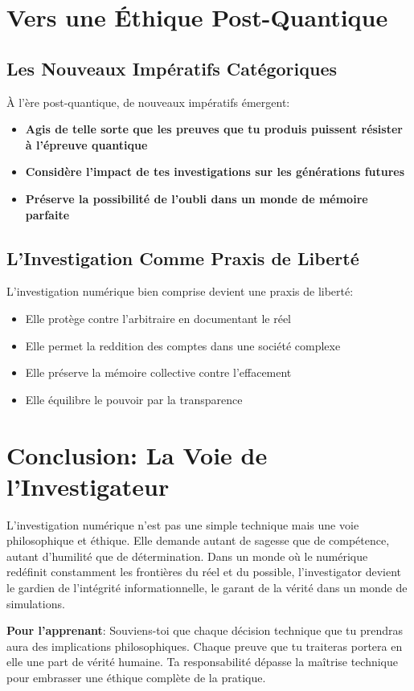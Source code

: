\section{Vers une Éthique Post-Quantique}
\subsection{Les Nouveaux Impératifs Catégoriques}
À l'ère post-quantique, de nouveaux impératifs émergent:
\begin{itemize}
\item \textbf{Agis de telle sorte que les preuves que tu produis puissent résister à l'épreuve quantique}
\item \textbf{Considère l'impact de tes investigations sur les générations futures}
\item \textbf{Préserve la possibilité de l'oubli dans un monde de mémoire parfaite}
\end{itemize}

\subsection{L'Investigation Comme Praxis de Liberté}
L'investigation numérique bien comprise devient une praxis de liberté:
\begin{itemize}
\item Elle protège contre l'arbitraire en documentant le réel
\item Elle permet la reddition des comptes dans une société complexe
\item Elle préserve la mémoire collective contre l'effacement
\item Elle équilibre le pouvoir par la transparence
\end{itemize}

\section*{Conclusion: La Voie de l'Investigateur}
L'investigation numérique n'est pas une simple technique mais une voie philosophique et éthique. Elle demande autant de sagesse que de compétence, autant d'humilité que de détermination. Dans un monde où le numérique redéfinit constamment les frontières du réel et du possible, l'investigator devient le gardien de l'intégrité informationnelle, le garant de la vérité dans un monde de simulations.

\medskip

\noindent\textbf{Pour l'apprenant}: Souviens-toi que chaque décision technique que tu prendras aura des implications philosophiques. Chaque preuve que tu traiteras portera en elle une part de vérité humaine. Ta responsabilité dépasse la maîtrise technique pour embrasser une éthique complète de la pratique.


